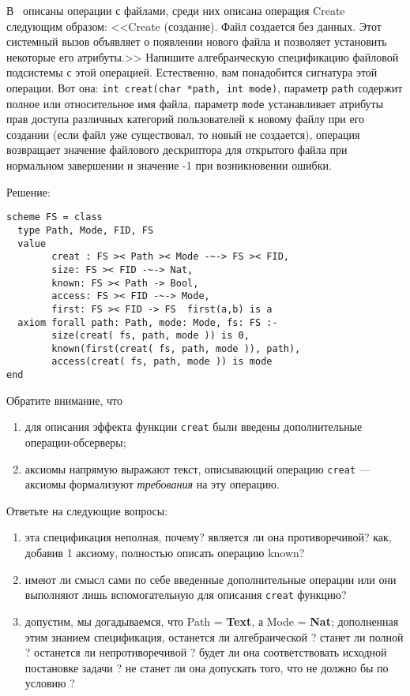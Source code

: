 
\z В~\cite{tanenbaum_os} описаны операции с файлами, среди них описана операция Create следующим образом: <<\textsf{Create} (создание). Файл создается без данных. Этот системный вызов объявляет о появлении нового файла и позволяет установить некоторые его атрибуты.>> Напишите алгебраическую спецификацию файловой подсистемы с этой операцией. Естественно, вам понадобится сигнатура этой операции. Вот она:  \texttt{int creat(char *path, int mode)}, параметр \texttt{path} содержит полное или относительное имя файла, параметр \texttt{mode} устанавливает атрибуты прав доступа различных категорий пользователей к новому файлу при его создании (если файл уже существовал, то новый не создается), операция возвращает значение файлового дескриптора для открытого файла при нормальном завершении и значение -1 при возникновении ошибки.

Решение:
\begin{lstlisting}
scheme FS = class
  type Path, Mode, FID, FS
  value
        creat : FS >< Path >< Mode -~-> FS >< FID,
        size: FS >< FID -~-> Nat,
        known: FS >< Path -> Bool,
        access: FS >< FID -~-> Mode,
        first: FS >< FID -> FS  first(a,b) is a
  axiom forall path: Path, mode: Mode, fs: FS :-
        size(creat( fs, path, mode )) is 0,
        known(first(creat( fs, path, mode )), path),
        access(creat( fs, path, mode )) is mode
end
\end{lstlisting}
Обратите внимание, что
\begin{enumerate}
  \item для описания эффекта функции \texttt{creat} были введены дополнительные операции-обсерверы;
  \item аксиомы напрямую выражают текст, описывающий операцию \texttt{creat} --- аксиомы формализуют \emph{требования} на эту операцию.
\end{enumerate}
Ответьте на следующие вопросы:
\begin{enumerate}
  \item эта спецификация неполная, почему? является ли она противоречивой? как, добавив 1 аксиому, полностью описать операцию known?
  \item имеют ли смысл сами по себе введенные дополнительные операции или они выполняют лишь вспомогательную для описания \texttt{creat} функцию?
  \item допустим, мы догадываемся, что Path = \textbf{Text}, а Mode = \textbf{Nat}; дополненная этим знанием спецификация, останется ли алгебраической ? станет ли полной ? останется ли непротиворечивой ? будет ли она соответствовать исходной постановке задачи ? не станет ли она допускать того, что не должно бы по условию ?
\end{enumerate}

